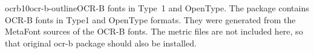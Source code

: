 \documentclass{ddltxtyp}
\begin{document}

\begin{package}{ocrb10}{ocr-b-outline}{OCR-B fonts in Type~1 and OpenType.}
The package contains OCR-B fonts in Type1 and OpenType formats.
They were generated from the MetaFont sources of the OCR-B
fonts. The metric files are not included here, so that original
ocr-b package should also be installed.
\end{package}
\end{document}
